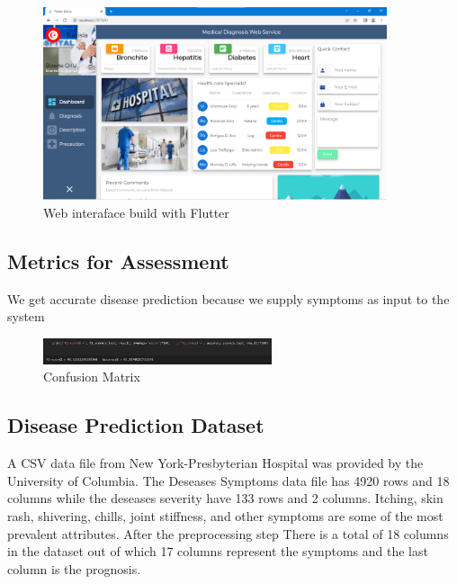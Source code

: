 \begin{figure}[htp]
    \centering
    \includegraphics[width=0.9\textwidth]{images/web.png}
    \caption{Web interaface build with Flutter }
    \label{fig:example4}
\end{figure}

\subsection{Metrics for Assessment}
\label{sec:Metrics for Assessment}

We get accurate disease prediction because we supply symptoms as input to the system
\begin{figure}[htp]
    \centering
    \includegraphics[width=0.6\textwidth]{images/metric.png}
    \caption{Confusion Matrix }
    \label{fig:example5}
\end{figure}

 \subsection{Disease Prediction Dataset}
 \label{sec:Disease Prediction Dataset}

A CSV data file from New York-Presbyterian Hospital was provided by the University 
of Columbia. The Deseases Symptoms data file has 4920 rows and 18 columns while the deseases severity have 133 rows and 2 columns.
Itching, skin rash, shivering, chills, joint stiffness, and other symptoms are some of the most prevalent attributes.
After the preprocessing step There is a total of 18 columns in the dataset out of which 17 columns represent the symptoms and the last column is the prognosis.

